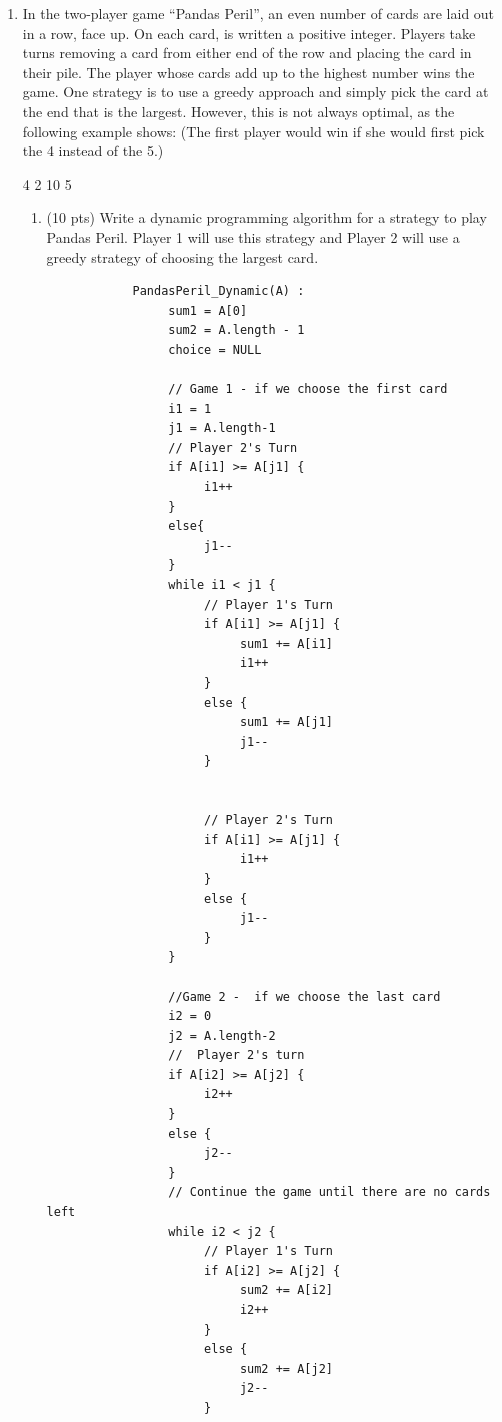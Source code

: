 \documentclass[12pt]{article}
\begin{document}
\begin{enumerate}
\begin{enumerate}
{		Because the \emph{wizard's algorithm} fulfills both the \emph{Optimal Substructure Property} and the \emph{Greedy Choice Property}, it will always yield an optimal solution for any set of coin denominations of a power of c.
	}\newpage

	\end{enumerate}

	
\item In the two-player game “Pandas Peril”, an even number of cards are laid out in a row, face up. On each card, is written a positive integer. Players take turns removing a card from either end of the row and placing the card in their pile. The player whose cards add up to the highest number wins the game.
One strategy is to use a greedy approach and simply pick the card at the end that is the largest. However, this is not always optimal, as the following example shows: (The first player would win if she would first pick the 4 instead of the 5.)

4 2 10 5

\begin{enumerate}
\item (10 pts) Write a dynamic programming algorithm for a strategy to play Pandas Peril. Player 1 will use this strategy and Player 2 will use a greedy strategy of choosing the largest card.

	{\color{blue}
		\begin{small}
		\begin{verbatim}
			PandasPeril_Dynamic(A) :
			     sum1 = A[0]
			     sum2 = A.length - 1
			     choice = NULL

			     // Game 1 - if we choose the first card
			     i1 = 1
			     j1 = A.length-1
			     // Player 2's Turn
			     if A[i1] >= A[j1] {
			          i1++
			     }
			     else{
			          j1--
			     }
			     while i1 < j1 {
			          // Player 1's Turn
			          if A[i1] >= A[j1] {
			               sum1 += A[i1]
			               i1++
			          }
			          else {
			               sum1 += A[j1]
			               j1--
			          }


			          // Player 2's Turn
			          if A[i1] >= A[j1] {
			               i1++
			          }
			          else {
			               j1--
			          }
			     }

			     //Game 2 -  if we choose the last card
			     i2 = 0
			     j2 = A.length-2
			     //  Player 2's turn
			     if A[i2] >= A[j2] {
			          i2++
			     }
			     else {
			          j2--
			     }
			     // Continue the game until there are no cards left
			     while i2 < j2 {
			          // Player 1's Turn
			          if A[i2] >= A[j2] {
			               sum2 += A[i2]
			               i2++
			          }
			          else {
			               sum2 += A[j2]
			               j2--
			          }
			

\end{verbatim}
\end{small}}
\end{enumerate}
\end{enumerate}
\end{document}
